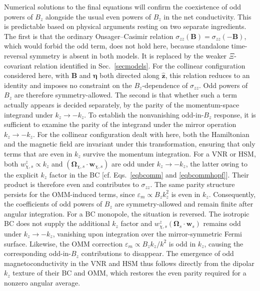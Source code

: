 \documentclass[aps,prb,onecolumn,nofootinbib,citeautoscript,10pt]{revtex4-2}
\newcommand{\bs}[1]{\boldsymbol{#1}}
\begin{document}
Numerical solutions to the final equations will confirm the coexistence of odd powers of $B_z$ alongside the usual even powers of $B_z$ in the net conductivity. This is predictable based on physical arguments resting on two separate ingredients. The first is that the ordinary Onsager--Casimir relation
$\sigma_{zz}(\bs B)=\sigma_{zz}(-\bs B)$, which would forbid the odd
term, does not hold here, because standalone time-reversal symmetry is
absent in both models. It is replaced by the weaker $\Xi$-covariant
relation identified in Sec.~\ref{secmodels}. For the collinear
configuration considered here, with $\bs B$ and $\bs\eta$ both directed
along $\hat{\bs z}$, this relation reduces to an identity and imposes no
constraint on the $B_z$-dependence of $\sigma_{zz}$. Odd powers of $B_z$
are therefore symmetry-allowed. The second is that whether such a
term actually appears is decided separately, by the parity of the
momentum-space integrand under $k_z\to-k_z$. To establish the nonvanishing odd-in-$B_z$ response, it is sufficient to examine the parity of the integrand under the mirror operation $k_z\to -k_z$. For the collinear configuration dealt with here, both the Hamiltonian and the magnetic field are invariant under this transformation, ensuring that only terms that are even in $k_z$ survive the momentum integration.
For a VNR or HSM, both $w^z_{\chi,s}\propto k_z$ and $(\bs\Omega_{\chi,s}\!\cdot\!\bs w_{\chi,s})$ are odd under $k_z\to -k_z$, the latter owing to the explicit $k_z$ factor in the BC [cf. Eqs.~\eqref{eqbcomm} and \eqref{eqbcommhopf}]. Their product is therefore even and contributes to $\sigma_{zz}$. The same parity structure persists for the OMM-induced terms, since $\varepsilon_m\propto B_z k_z^2$ is even in $k_z$. Consequently, the coefficients of odd powers of $B_z$ are symmetry-allowed and remain finite after angular integration. For a BC monopole, the situation is reversed. The isotropic BC does not supply the additional $k_z$ factor and $w^z_{\chi,s}(\bs\Omega_s\!\cdot\!\bs w_s)$ remains odd under $k_z\to -k_z$, vanishing upon integration over the mirror-symmetric Fermi surface. Likewise, the OMM correction $\varepsilon_m\propto B_z k_z/k^2$ is odd in $k_z$, causing the corresponding odd-in-$B_z$ contributions to disappear. The emergence of odd magnetoconductivity in the VNR and HSM thus follows directly from the dipolar $k_z$ texture of their BC and OMM, which restores the even parity required for a nonzero angular average.
\end{document}
